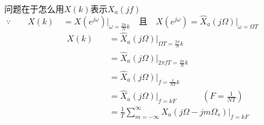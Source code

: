 \documentclass[notheorems,compress,mathserif,table]{beamer}
\begin{document}
\begin{frame}[shrink]\frametitle{}%

问题在于怎么用$X(k)$表示$X_a(jf)$
$$\because\qquad X(k) \quad =  X\left(e^{j\omega}\right)\big|_{\omega = \frac{2\pi}{N} k}   \quad\mbox{且}\quad
X\left(e^{j\omega}\right) =  \hat{X}_a(j\Omega)\big|_{ \omega = \Omega T }  \qquad\qquad\qquad $$
\begin{equation*}
\begin{split}
X(k) \quad&=  \hat{X}_a(j\Omega)\big|_{ \Omega T =\frac{2\pi}{N} k  }   \quad \\
          &=  \hat{X}_a(j\Omega)\big|_{ 2\pi f T =\frac{2\pi}{N} k  } \\
          &=  \hat{X}_a(j\Omega)\big|_{ f  =\frac{1}{NT} k  } \quad\\
          &=  \hat{X}_a(j\Omega)\big|_{ f  =k F  }   \qquad\quad  (F= \frac{1}{NT})\\
          &=  \frac{1}{T}\sum_{m=-\infty}^{\infty}X_a\left(j\Omega-j m\Omega_s\right)\Big|_{ f  = k F  }   \\
\end{split}
\end{equation*}
\end{frame}
\end{document}
